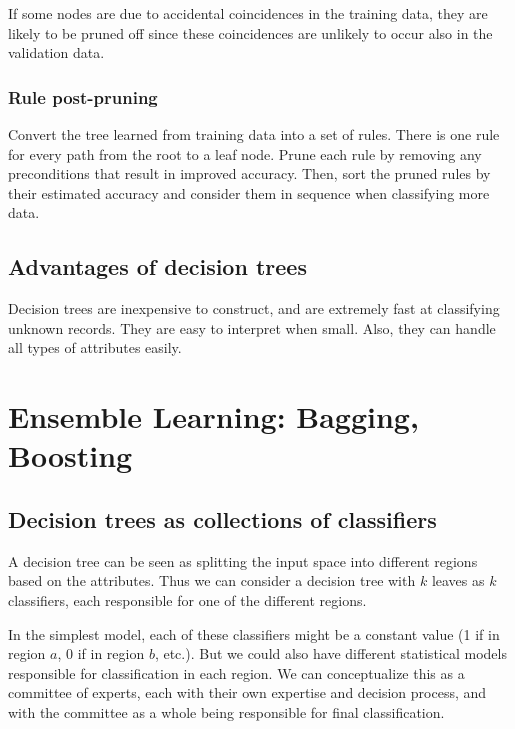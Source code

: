 \documentclass[a4paper,12pt]{article}
\begin{document}
If some nodes are due to accidental coincidences in the training data, they are likely to be pruned off since these coincidences are unlikely to occur also in the validation data. 

\subsubsection{Rule post-pruning}

Convert the tree learned from training data into a set of rules. There is one rule for every path from the root to a leaf node. Prune each rule by removing any preconditions that result in improved accuracy. Then, sort the pruned rules by their estimated accuracy and consider them in sequence when classifying more data. 

\subsection{Advantages of decision trees}

Decision trees are inexpensive to construct, and are extremely fast at classifying unknown records. They are easy to interpret when small. Also, they can handle all types of attributes easily. 



\clearpage

\section{Ensemble Learning: Bagging, Boosting}

\subsection{Decision trees as collections of classifiers}

A decision tree can be seen as splitting the input space into different regions based on the attributes. Thus we can consider a decision tree with $k$ leaves as $k$ classifiers, each responsible for one of the different regions. 

In the simplest model, each of these classifiers might be a constant value (1 if in region $a$, 0 if in region $b$, etc.). But we could also have different statistical models responsible for classification in each region. We can conceptualize this as a committee of experts, each with their own expertise and decision process, and with the committee as a whole being responsible for final classification. 
\end{document}
